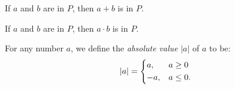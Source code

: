 \begin{theorem}
If $a$ and $b$ are in $P$, then $a + b$ is in $P$.
\cite[p.~9]{spivak}
\end{theorem}

\begin{theorem}
If $a$ and $b$ are in $P$, then $a \cdot b$ is in $P$.
\cite[p.~9]{spivak}
\end{theorem}

\begin{defn}
    For any number $a$, we define the \emph{absolute value}
    $|a|$ of $a$ to be:\cite[p.~11]{spivak}
    \begin{equation}
        |a| = \begin{dcases}
            a, &a \geq 0\\
            -a, & a \leq 0.
        \end{dcases}
    \end{equation}
\end{defn}

